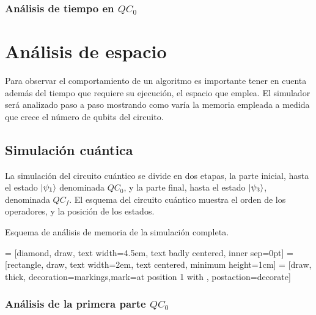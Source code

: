\subsubsection{Análisis de tiempo en $QC_0$}


\section{Análisis de espacio}
Para observar el comportamiento de un algoritmo es importante tener en cuenta 
además del tiempo que requiere su ejecución, el espacio que emplea. El simulador 
será analizado paso a paso mostrando como varía la memoria empleada a medida que 
crece el número de qubits del circuito.

\subsection{Simulación cuántica}
La simulación del circuito cuántico se divide en dos etapas, la parte inicial, 
hasta el estado $\ket{\psi_{1}}$ denominada $QC_0$, y la parte final, hasta el estado 
$\ket{\psi_{3}}$, denominada $QC_f$. El esquema del circuito cuántico muestra el orden 
de los operadores, y la posición de los estados.
%

%
Esquema de análisis de memoria de la simulación completa.
%
\begin{center}
 = [diamond, draw, text width=4.5em, text badly centered, 
inner sep=0pt]
 = [rectangle, draw, text width=2em, text centered, minimum 
height=1cm]
 = [draw, thick, decoration={markings,mark=at position 
1 with {}}, postaction={decorate}]
%
\end{center}
%
\subsubsection{Análisis de la primera parte $QC_0$}

